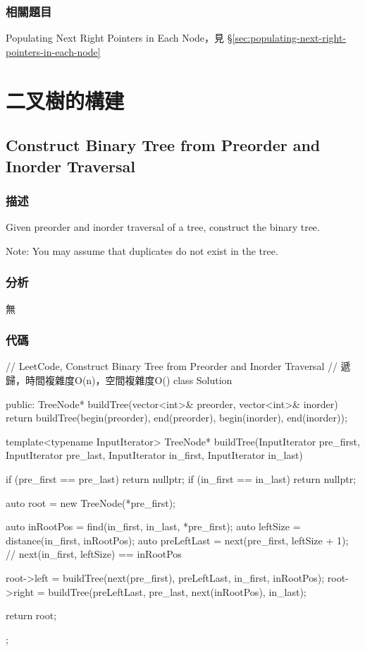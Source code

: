 \subsubsection{相關題目}
\begindot
\item Populating Next Right Pointers in Each Node，見 \S \ref{sec:populating-next-right-pointers-in-each-node}
\myenddot


\section{二叉樹的構建} %


\subsection{Construct Binary Tree from Preorder and Inorder Traversal}
\label{sec:construct-binary-tree-from-preorder-and-inorder-traversal}


\subsubsection{描述}
Given preorder and inorder traversal of a tree, construct the binary tree.

Note:
You may assume that duplicates do not exist in the tree.


\subsubsection{分析}
無


\subsubsection{代碼}
\begin{Code}
// LeetCode, Construct Binary Tree from Preorder and Inorder Traversal
// 遞歸，時間複雜度O(n)，空間複雜度O(\logn)
class Solution {
public:
    TreeNode* buildTree(vector<int>& preorder, vector<int>& inorder) {
        return buildTree(begin(preorder), end(preorder),
                begin(inorder), end(inorder));
    }

    template<typename InputIterator>
    TreeNode* buildTree(InputIterator pre_first, InputIterator pre_last,
            InputIterator in_first, InputIterator in_last) {
        if (pre_first == pre_last) return nullptr;
        if (in_first == in_last) return nullptr;

        auto root = new TreeNode(*pre_first);

        auto inRootPos = find(in_first, in_last, *pre_first);
        auto leftSize = distance(in_first, inRootPos);
        auto preLeftLast = next(pre_first, leftSize + 1);
        // next(in_first, leftSize) == inRootPos

        root->left = buildTree(next(pre_first), preLeftLast, in_first, inRootPos);
        root->right = buildTree(preLeftLast, pre_last, next(inRootPos), in_last);

        return root;
    }
};
\end{Code}



